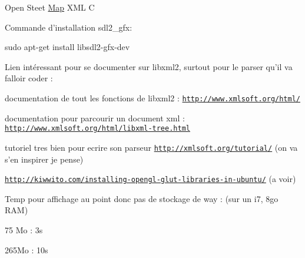 Open Steet \hyperlink{structMap}{Map} X\-M\-L C

Commande d'installation sdl2\-\_\-gfx\-:
\begin{DoxyItemize}
\item sudo apt-\/get install libsdl2-\/gfx-\/dev
\end{DoxyItemize}

Lien intéressant pour se documenter sur libxml2, surtout pour le parser qu'il va falloir coder \-:
\begin{DoxyItemize}
\item documentation de tout les fonctions de libxml2 \-: \href{http://www.xmlsoft.org/html/}{\tt http\-://www.\-xmlsoft.\-org/html/}
\item documentation pour parcourir un document xml \-: \href{http://www.xmlsoft.org/html/libxml-tree.html}{\tt http\-://www.\-xmlsoft.\-org/html/libxml-\/tree.\-html}
\item tutoriel tres bien pour ecrire son parseur \href{http://xmlsoft.org/tutorial/}{\tt http\-://xmlsoft.\-org/tutorial/} (on va s'en inspirer je pense)
\item \href{http://kiwwito.com/installing-opengl-glut-libraries-in-ubuntu/}{\tt http\-://kiwwito.\-com/installing-\/opengl-\/glut-\/libraries-\/in-\/ubuntu/} (a voir)
\end{DoxyItemize}

Temp pour affichage au point donc pas de stockage de way \-: (sur un i7, 8go R\-A\-M)
\begin{DoxyItemize}
\item 75 Mo \-: 3s
\item 265\-Mo \-: 10s 
\end{DoxyItemize}